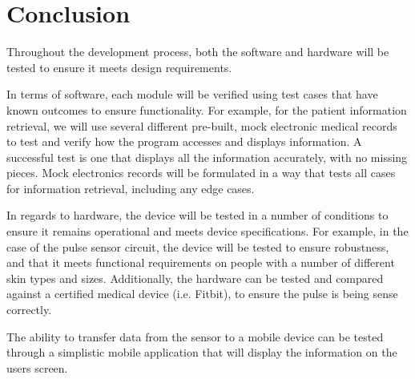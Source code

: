 \section{Conclusion}

Throughout the development process, both the software and hardware will be tested to ensure it meets design requirements.

In terms of software, each module will be verified using test cases that have known outcomes to ensure functionality. For example, for the patient information retrieval, we will use several different pre-built, mock electronic medical records to test and verify how the program accesses and displays information. A successful test is one that displays all the information accurately, with no missing pieces. Mock electronics records will be formulated in a way that tests all cases for information retrieval, including any edge cases. \iffalse For software, the majority of test cases can be determined by using the functional requirements to explore how each component of the system interacts and testing all possibilities.
The hardware will be tested in a similar way, using test cases to verify the hardware meets specification. \fi

In regards to hardware, the device will be tested in a number of conditions to ensure it remains operational and meets device specifications. For example, in the case of the pulse sensor circuit, the device will be tested to ensure robustness, and that it meets functional requirements on people with a number of different skin types and sizes. Additionally, the hardware can be tested and compared against a certified medical device (i.e. Fitbit), to ensure the pulse is being sense correctly.

The ability to transfer data from the sensor to a mobile device can be tested through a simplistic mobile application that will display the information on the users screen.
